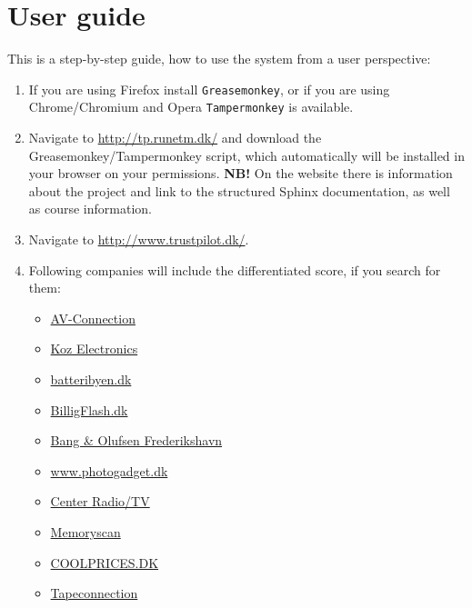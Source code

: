 \documentclass[10pt]{IEEEtran}
\begin{document}



\clearpage
\onecolumn
\appendices

\section{User guide}
\vspace*{10mm}
This is a step-by-step guide, how to use the system from a user perspective:
\begin{enumerate}
	\item If you are using Firefox install \texttt{Greasemonkey}\cite{GreaseMonkey}, or if you are using Chrome/Chromium and Opera \texttt{Tampermonkey}\cite{TamperMonkey} is available.
	\item Navigate to \url{http://tp.runetm.dk/} and download the Greasemonkey/Tampermonkey script, which automatically will be installed in your browser on your permissions. \newline
	\textbf{NB!} On the website there is information about the project and link to the structured Sphinx documentation, as well as course information.
	\item Navigate to \url{http://www.trustpilot.dk/}.
	\item Following companies will include the differentiated score, if you search for them:
	\begin{itemize}
		\item \href{http://www.trustpilot.dk/review/www.av-connection.dk}{AV-Connection}
		\item \href{http://www.trustpilot.dk/review/www.koz.dk}{Koz Electronics}
		\item \href{http://www.trustpilot.dk/review/www.batteribyen.dk}{batteribyen.dk}
		\item \href{http://www.trustpilot.dk/review/www.billigflash.dk}{BilligFlash.dk}
		\item \href{http://www.trustpilot.dk/review/www.b-o.dk}{Bang \& Olufsen Frederikshavn}
		\item \href{http://www.trustpilot.dk/review/www.photogadget.dk}{www.photogadget.dk}
		\item \href{http://www.trustpilot.dk/review/www.crtv.dk}{Center Radio/TV}
		\item \href{http://www.trustpilot.dk/review/www.memoryscan.dk}{Memoryscan}
		\item \href{http://www.trustpilot.dk/review/www.coolprices.dk}{COOLPRICES.DK}
		\item \href{http://www.trustpilot.dk/review/tapeconnectio.dk}{Tapeconnection}

\end{itemize}
\end{enumerate}
\end{document}
